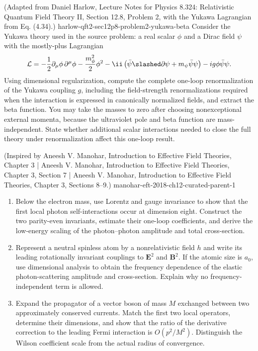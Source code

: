 \begin{enumerate}
  {(Adapted from Daniel Harlow, Lecture Notes for Physics 8.324: Relativistic Quantum Field Theory II, Section 12.8, Problem 2, with the Yukawa Lagrangian from Eq. (4.34).)}
  {harlow-qft2-sec12p8-problem2-yukawa-beta}
Consider the Yukawa theory used in the source problem: a real scalar
\(\phi\) and a Dirac field \(\psi\) with the mostly-plus Lagrangian
\[
 \mathcal L=-\frac12\partial_\mu\phi\,\partial^\mu\phi
 -\frac{m_\phi^2}{2}\phi^2
 -\ii\left(\bar\psi\slashed\partial\psi+m_\psi\bar\psi\psi\right)
 -ig\phi\bar\psi\psi.
\]
Using dimensional regularization, compute the complete one-loop
renormalization of the Yukawa coupling \(g\), including the field-strength
renormalizations required when the interaction is expressed in canonically
normalized fields, and extract the beta function.  You may take the masses
to zero after choosing nonexceptional external momenta, because the
ultraviolet pole and beta function are mass-independent.  State whether
additional scalar interactions needed to close the full theory under
renormalization affect this one-loop result.

  {(Inspired by Aneesh V. Manohar, Introduction to Effective Field Theories, Chapter 3 | Aneesh V. Manohar, Introduction to Effective Field Theories, Chapter 3, Section 7 | Aneesh V. Manohar, Introduction to Effective Field Theories, Chapter 3, Sections 8--9.)}
  {manohar-eft-2018-ch12-curated-parent-1}
\begin{enumerate}
\item
Below the electron mass, use Lorentz and gauge invariance to show that the
first local photon self-interactions occur at dimension eight.  Construct
the two parity-even invariants, estimate their one-loop coefficients, and
derive the low-energy scaling of the photon--photon amplitude and total
cross-section.
\item
Represent a neutral spinless atom by a nonrelativistic field \(h\) and
write its leading rotationally invariant couplings to
\(\mathbf E^2\) and \(\mathbf B^2\).  If the atomic size is \(a_0\), use
dimensional analysis to obtain the frequency dependence of the elastic
photon-scattering amplitude and cross-section.  Explain why no
frequency-independent term is allowed.
\item
Expand the propagator of a vector boson of mass \(M\) exchanged between two
approximately conserved currents.  Match the first two local operators,
determine their dimensions, and show that the ratio of the derivative
correction to the leading Fermi interaction is \(O(p^2/M^2)\).  Distinguish
the Wilson coefficient scale from the actual radius of convergence.
\end{enumerate}


\end{enumerate}
